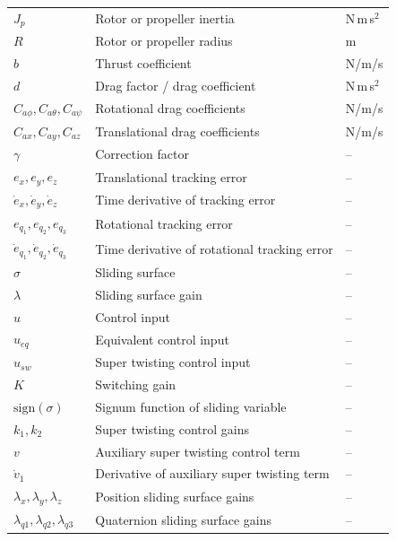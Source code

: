\documentclass[12pt,a4paper]{report}
\begin{document}
\begin{longtable}{p{3cm} p{9cm} p{2.5cm}}
$J_p$ & Rotor or propeller inertia & N\,m\,s$^2$ \\
$R$ & Rotor or propeller radius & m \\

$b$ & Thrust coefficient & N/m/s \\
$d$ & Drag factor / drag coefficient & N\,m\,s$^2$ \\
$C_{a\phi}, C_{a\theta}, C_{a\psi}$ & Rotational drag coefficients & N/m/s \\
$C_{ax}, C_{ay}, C_{az}$ & Translational drag coefficients & N/m/s \\
$\gamma$ & Correction factor & -- \\

$e_x,e_y,e_z $ & Translational tracking error  & -- \\

$\dot e_x,\dot e_y, \dot e_z $ & Time derivative of tracking error & -- \\
$e_q_1,e_q_2,e_q_3 $ & Rotational tracking error  & -- \\
$\dot e_q_1,\dot e_q_2,\dot e_q_3 $ & Time derivative of rotational tracking error  & -- \\

$\sigma $ & Sliding surface & -- \\
$\lambda$ & Sliding surface gain  & -- \\
$u$ & Control input & -- \\
$u_{eq}$ & Equivalent control input & -- \\
$u_{sw}$ & Super twisting control input & -- \\
$K$ & Switching gain & -- \\
$\mathrm{sign}(\sigma)$ & Signum function of sliding variable & -- \\

$k_1, k_2$ & Super twisting control gains & -- \\
$v$ & Auxiliary super twisting control term & -- \\
$\dot{v}_1$ & Derivative of auxiliary super twisting term & -- \\

$\lambda_x, \lambda_y, \lambda_z$ & Position sliding surface gains & -- \\
$\lambda_{q1}, \lambda_{q2}, \lambda_{q3}$ & Quaternion sliding surface gains & -- \\


\end{longtable}
\end{document}
